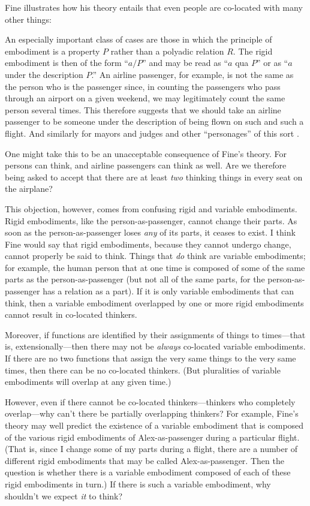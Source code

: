 \documentclass[11pt]{article}
\newenvironment{squote}{%
\begin{spacing}{1}
\begin{list}{}{%
\setlength{\labelwidth}{0pt}%
\rightmargin\leftmargin%
}
\item\relax
}{%
\end{list}%
\end{spacing}
}
\begin{document}
\begin{spacing}{1.5}
Fine illustrates how his theory entails that even people are
co-located with many other things:

\begin{squote}
An especially important class of cases are those in which the
principle of embodiment is a property $P$ rather than a polyadic
relation $R$.  The rigid embodiment is then of the form ``$a/P$'' and
may be read as ``$a$ qua $P$'' or as ``$a$ under the description
$P$.''  An airline passenger, for example, is not the same as the
person who is the passenger since, in counting the passengers who pass
through an airport on a given weekend, we may legitimately count the
same person several times.  This therefore suggests that we should
take an airline passenger to be someone under the description of being
flown on such and such a flight.  And similarly for mayors and judges
and other ``personages'' of this sort \citeyearpar[67--68]{fine1999}.
\end{squote}

One might take this to be an unacceptable consequence of Fine's
theory.  For persons can think, and airline passengers can think as
well.  Are we therefore being asked to accept that there are at least
{\em two} thinking things in every seat on the airplane?

This objection, however, comes from confusing rigid and variable
embodiments.  Rigid embodiments, like the person-as-passenger, cannot
change their parts.  As soon as the person-as-passenger loses {\em
  any} of its parts, it ceases to exist.  I think Fine would say that
rigid embodiments, because they cannot undergo change, cannot properly
be said to think.  Things that {\em do} think are variable
embodiments; for example, the human person that at one time is
composed of some of the same parts as the person-as-passenger (but not
all of the same parts, for the person-as-passenger has a relation as a
part).  If it is only variable embodiments that can think, then a
variable embodiment overlapped by one or more rigid embodiments cannot
result in co-located thinkers.

Moreover, if functions are identified by their assignments of things
to times---that is, extensionally---then there may not be {\em always}
co-located variable embodiments.  If there are no two functions that
assign the very same things to the very same times, then there can be
no co-located thinkers.  (But pluralities of variable embodiments will
overlap at any given time.)

However, even if there cannot be co-located thinkers---thinkers who
completely overlap---why can't there be partially overlapping
thinkers?  For example, Fine's theory may well predict the existence
of a variable embodiment that is composed of the various rigid
embodiments of Alex-as-passenger during a particular flight.  (That
is, since I change some of my parts during a flight, there are a
number of different rigid embodiments that may be called
Alex-as-passenger.  Then the question is whether there is a variable
embodiment composed of each of these rigid embodiments in turn.)  If
there is such a variable embodiment, why shouldn't we expect {\em it}
to think?


\end{spacing}
\end{document}
